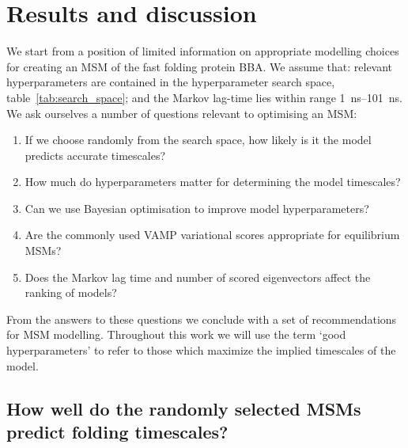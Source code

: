 \documentclass[journal=jacsat,manuscript=article]{achemso}
\begin{document}
\section{Results and discussion}

We start from a position of limited information on appropriate modelling choices for creating an MSM of the fast folding protein BBA.  We assume that: 
relevant hyperparameters are contained in the  hyperparameter search space, table~\ref{tab:search_space}; and the Markov lag-time lies within range \SIrange{1}{101}{\nano\second}.  We  ask ourselves a number of questions relevant to optimising an MSM:

\begin{enumerate}
    \item If we choose randomly from the search space, how likely is it the model predicts accurate timescales? 
    \item How much do hyperparameters matter for determining the model timescales? 
    \item Can we use Bayesian optimisation to improve model hyperparameters? 
    \item Are the commonly used VAMP variational scores appropriate for equilibrium MSMs? 
    \item Does the Markov lag time and number of scored eigenvectors affect the ranking of models?  
\end{enumerate}

From the answers to these questions we conclude with a set of recommendations for MSM modelling.  Throughout this work we will use the term `good hyperparameters' to refer to those which maximize the implied timescales of the model. 

\subsection{How well do the randomly selected MSMs predict folding timescales?}
\end{document}
